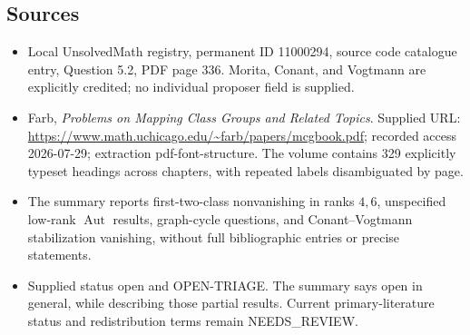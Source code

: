 \documentclass[11pt]{article}
\begin{document}
\subsection{Sources}
\begin{itemize}
\item Local UnsolvedMath registry, permanent ID 11000294, source code catalogue entry, Question 5.2, PDF page 336. Morita, Conant, and Vogtmann are explicitly credited; no individual proposer field is supplied.
\item Farb, \emph{Problems on Mapping Class Groups and Related Topics}. Supplied URL: \url{https://www.math.uchicago.edu/~farb/papers/mcgbook.pdf}; recorded access 2026-07-29; extraction pdf-font-structure. The volume contains 329 explicitly typeset headings across chapters, with repeated labels disambiguated by page.
\item The summary reports first-two-class nonvanishing in ranks \(4,6\), unspecified low-rank \(\operatorname{Aut}\) results, graph-cycle questions, and Conant--Vogtmann stabilization vanishing, without full bibliographic entries or precise statements.
\item Supplied status open and OPEN-TRIAGE. The summary says open in general, while describing those partial results. Current primary-literature status and redistribution terms remain NEEDS\_REVIEW.
\end{itemize}
\end{document}
